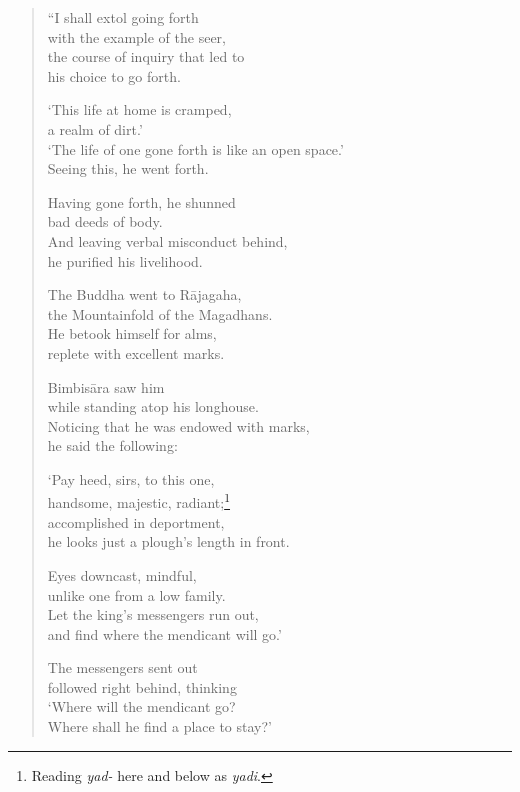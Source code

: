 \documentclass[12pt,openany]{book}%
\begin{document}
\begin{verse}%
“I shall extol going forth \\
with the example of the seer, \\
the course of inquiry that led to \\
his choice to go forth. 

‘This life at home is cramped, \\
a realm of dirt.’ \\
‘The life of one gone forth is like an open space.’ \\
Seeing this, he went forth. 

Having gone forth, he shunned \\
bad deeds of body. \\
And leaving verbal misconduct behind, \\
he purified his livelihood. 

The Buddha went to \textsanskrit{Rājagaha}, \\
the Mountainfold of the Magadhans. \\
He betook himself for alms, \\
replete with excellent marks. 

\textsanskrit{Bimbisāra} saw him \\
while standing atop his longhouse. \\
Noticing that he was endowed with marks, \\
he said the following: 

‘Pay heed, sirs, to this one, \\
handsome, majestic, radiant;\footnote{Reading \textit{yad-} here and below as \textit{yadi}. } \\
accomplished in deportment, \\
he looks just a plough’s length in front. 

Eyes downcast, mindful, \\
unlike one from a low family. \\
Let the king’s messengers run out, \\
and find where the mendicant will go.’ 

The messengers sent out \\
followed right behind, thinking \\
‘Where will the mendicant go? \\
Where shall he find a place to stay?’ 


\end{verse}
\end{document}
